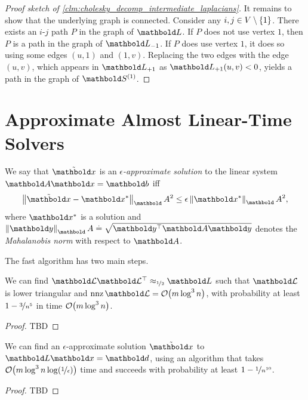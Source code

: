 \begin{proof}[Proof sketch of \cref{clm:cholesky_decomp_intermediate_laplacians}]
It remains to show that the underlying graph is connected. Consider any $i,j \in V \setminus \{1\}$. There exists an $i$-$j$ path $P$ in the graph of $\mL$. If $P$ does not use vertex $1$, then $P$ is a path in the graph of $\mL_{-1}$. If $P$ does use vertex $1$, it does so using some edges $(u,1)$ and $(1,v)$. Replacing the two edges with the edge $(u,v)$, which appears in $\mL_{+1}$ as $\mL_{+1}(u,v) < 0$, yields a path in the graph of $\mS^{(1)}$.
\end{proof}

\section{Approximate Almost Linear-Time Solvers}

\begin{defn} We say that $\Tilde{\vx}$ is an \emph{$\epsilon$-approximate solution} to the linear system $\mA\vx = \vb$ iff \begin{align}
    \norm{\Tilde{\vx} - \s{\vx}}_\mA^2 \leq \epsilon \norm{\s{\vx}}_\mA^2,
\end{align} where $\s{\vx}$ is a solution and $\norm{\vy}_\mA \defeq \sqrt{\trans{\vy}\mA\vy}$ denotes the \emph{Mahalanobis norm} with respect to $\mA$.
\end{defn}

The fast algorithm has two main steps.

\begin{thm} We can find $\mCalL\trans{\mCalL} \approx_{\nicefrac{1}{2}} \mL$ such that $\mCalL$ is lower triangular and $\nnz{\mCalL} = \LandauO{m \log^3 n}$, with probability at least $1 - \nicefrac{3}{n^5}$ in time $\LandauO{m \log^3 n}$.\cite{kyng2016approximate}
\end{thm}
\begin{proof}
TBD
\end{proof}

\begin{thm} We can find an $\epsilon$-approximate solution $\Tilde{\vx}$ to $\mL\vx = \vd$, using an algorithm that takes $\LandauO{m \log^3 n \log(\nicefrac{1}{\epsilon})}$ time and succeeds with probability at least $1 - \nicefrac{1}{n^{10}}$.
\end{thm}
\begin{proof}
TBD
\end{proof}